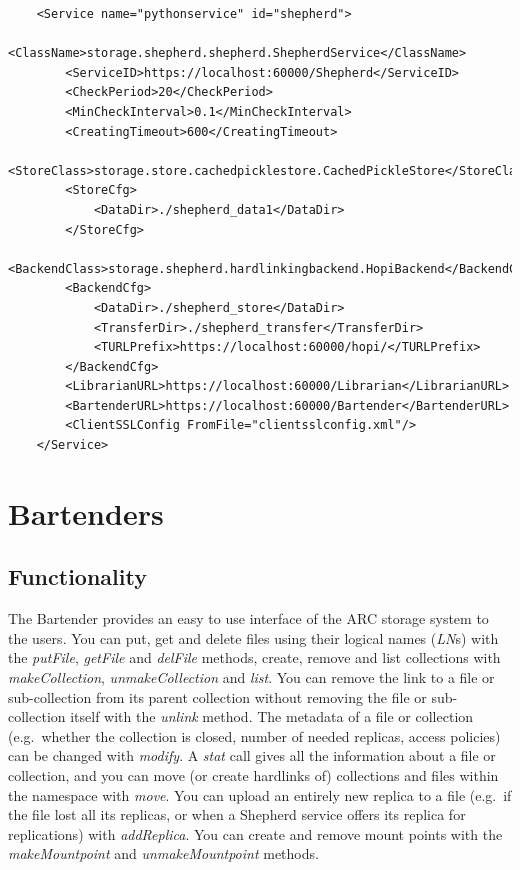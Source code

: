 \documentclass{book}
\begin{document}
\begin{verbatim}
    <Service name="pythonservice" id="shepherd">
        <ClassName>storage.shepherd.shepherd.ShepherdService</ClassName>
        <ServiceID>https://localhost:60000/Shepherd</ServiceID>
        <CheckPeriod>20</CheckPeriod>
        <MinCheckInterval>0.1</MinCheckInterval>
        <CreatingTimeout>600</CreatingTimeout>
        <StoreClass>storage.store.cachedpicklestore.CachedPickleStore</StoreClass>
        <StoreCfg>
            <DataDir>./shepherd_data1</DataDir>
        </StoreCfg>
        <BackendClass>storage.shepherd.hardlinkingbackend.HopiBackend</BackendClass>
        <BackendCfg>
            <DataDir>./shepherd_store</DataDir>
            <TransferDir>./shepherd_transfer</TransferDir>
            <TURLPrefix>https://localhost:60000/hopi/</TURLPrefix>
        </BackendCfg>
        <LibrarianURL>https://localhost:60000/Librarian</LibrarianURL>
        <BartenderURL>https://localhost:60000/Bartender</BartenderURL>
        <ClientSSLConfig FromFile="clientsslconfig.xml"/>
    </Service>    
\end{verbatim}


\newpage

\section{Bartenders} %
\label{sec:bartenders}

\subsection{Functionality} %

The Bartender provides an easy to use interface of the ARC storage system to the users. You can put, get and delete files using their logical names (\emph{LN}s) with the \emph{putFile}, \emph{getFile} and \emph{delFile} methods, create, remove and list collections with \emph{makeCollection}, \emph{unmakeCollection} and \emph{list}. You can remove the link to a file or sub-collection from its parent collection without removing the file or sub-collection itself with the \emph{unlink} method. The metadata of a file or collection (e.g.~whether the collection is closed, number of needed replicas, access policies) can be changed with \emph{modify}. A \emph{stat} call gives all the information about a file or collection, and you can move (or create hardlinks of) collections and files within the namespace with \emph{move}. You can upload an entirely new replica to a file (e.g.~if the file lost all its replicas, or when a Shepherd service offers its replica for replications) with \emph{addReplica}. You can create and remove mount points with the \emph{makeMountpoint} and \emph{unmakeMountpoint} methods.
\end{document}
